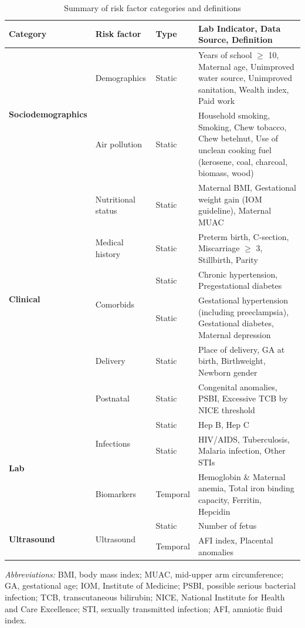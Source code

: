 \documentclass[fleqn,10pt]{wlscirep}
\begin{document}
\begin{table}[htbp]
\centering
\scriptsize
\begin{tabular}{|p{2.5cm}|p{2cm}|p{1cm}|p{6cm}|}
\hline
\textbf{Category} & \textbf{Risk factor} & \textbf{Type} & \textbf{Lab Indicator, Data Source, Definition} \\
\hline
\multirow{2}{*}{\textbf{Sociodemographics}} 
& Demographics & Static & Years of school $\geq$ 10, Maternal age, Unimproved water source, Unimproved sanitation, Wealth index, Paid work \\
\cline{2-4}
& Air pollution & Static & Household smoking, Smoking, Chew tobacco, Chew betelnut, Use of unclean cooking fuel (kerosene, coal, charcoal, biomass, wood) \\
\hline
\multirow{6}{*}{\textbf{Clinical}} 
& Nutritional status & Static & Maternal BMI, Gestational weight gain (IOM guideline\cite{steinberg2011clinical}), Maternal MUAC \\
\cline{2-4}
& Medical history & Static & Preterm birth, C-section, Miscarriage $\geq$ 3, Stillbirth, Parity \\
\cline{2-4}
& \multirow{2}{*}{Comorbids} & Static & Chronic hypertension, Pregestational diabetes \\
\cline{3-4}
& & Static & Gestational hypertension (including preeclampsia), Gestational diabetes, Maternal depression \\
\cline{2-4}
& Delivery & Static & Place of delivery, GA at birth, Birthweight, Newborn gender \\
\cline{2-4}
& Postnatal & Static & Congenital anomalies, PSBI, Excessive TCB by NICE threshold \cite{amos2017jaundice}\\
\hline
\multirow{3}{*}{\textbf{Lab}} 
& \multirow{2}{*}{Infections} & Static & Hep B, Hep C \\
\cline{3-4}
& & Static & HIV/AIDS, Tuberculosis, Malaria infection, Other STIs \\
\cline{2-4}
& Biomarkers & Temporal & Hemoglobin \& Maternal anemia, Total iron binding capacity, Ferritin, Hepcidin \\
\hline
\multirow{3}{*}{\textbf{Ultrasound}} 
& \multirow{3}{*}{Ultrasound} & Static & Number of fetus \\
\cline{3-4}
& & Temporal & AFI index, Placental anomalies \\
\hline
\end{tabular}
\caption{Summary of risk factor categories and definitions}
\label{table:covariates}
\vspace{0.2cm}
\parbox{0.9\textwidth}{\scriptsize 
\textit{Abbreviations:} BMI, body mass index; MUAC, mid-upper arm circumference; GA, gestational age; IOM, Institute of Medicine; PSBI, possible serious bacterial infection; 
TCB, transcutaneous bilirubin; NICE, National Institute for Health and Care Excellence; 
STI, sexually transmitted infection; AFI, amniotic fluid index.
}
\end{table}
\end{document}
